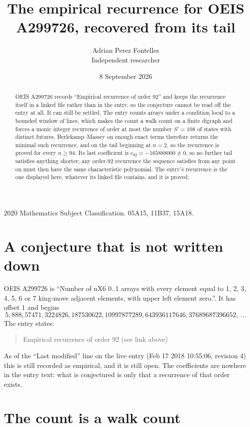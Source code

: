 \documentclass[11pt,a4paper]{article}
\title{The empirical recurrence for OEIS A299726, recovered from its tail}
\author{Adrian Perez Fontelles\\ \small Independent researcher}
\date{8 September 2026}
\theoremstyle{plain}
\theoremstyle{definition}
\begin{document}
\maketitle

\begin{abstract}
OEIS A299726 records ``Empirical recurrence of order $92$'' and keeps the recurrence itself in
a linked file rather than in the entry, so the conjecture cannot be read off the entry at all.
It can still be settled. The entry counts arrays under a condition local to a bounded window of
lines, which makes the count a walk count on a finite digraph and forces a monic integer
recurrence of order at most the number $S'=108$ of states with distinct futures. Berlekamp--Massey on
enough exact terms therefore returns the minimal such recurrence, and on the tail beginning at $n=2$, so the recurrence is proved for every $n\ge94$.
Its last coefficient is $c_{92}=-165888000\neq0$, so no further tail satisfies anything
shorter; any order-$92$ recurrence the sequence satisfies from any point on must then have
the same characteristic polynomial. The entry's recurrence is the one displayed here, whatever
its linked file contains, and it is proved.
\end{abstract}

\noindent\small 2020 Mathematics Subject Classification. 05A15, 11B37, 15A18.\normalsize

\section{A conjecture that is not written down}

OEIS A299726 is ``Number of nX6 0..1 arrays with every element equal to 1, 2, 3, 4, 5, 6 or 7 king-move adjacent elements, with upper left element zero.''. It has offset $1$ and begins
\[
5, 888, 57471, 3224826, 187530622, 10997877289, 643936117646, 37689687396652,\ \dots
\]
The entry states:
\begin{quote}
Empirical recurrence of order 92 (see link above)
\end{quote}
As of the ``Last modified'' line on the live entry (Feb 17 2018 10:55:06, revision 4)
this is still recorded as empirical, and it is still open. The coefficients are nowhere in the
entry text: what is conjectured is only that a recurrence of that order exists.

\section{The count is a walk count}
\end{document}
